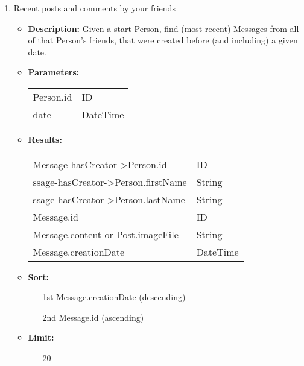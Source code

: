 {\begin{enumerate}
                \item Recent posts and comments by your friends
                    \begin{itemize}
                        \item \textbf{Description:}
                          Given a start Person, find (most recent) Messages from
                            all of that Person's friends, that were created before (and
                            including) a given date.    			
                        \item \textbf{Parameters:} \\
                            \begin{tabular}{ll}
                                Person.id 										& ID \\
                                date 											& DateTime \\
                            \end{tabular}
                        \item \textbf{Results:} \\
                            \begin{tabular}{ll}
                              Message-hasCreator->Person.id 										& ID \\
                                ssage-hasCreator->Person.firstName								& String \\
                                ssage-hasCreator->Person.lastName									& String \\
                                Message.id 								& ID \\
                                Message.content or Post.imageFile 	& String \\
                                Message.creationDate	& DateTime \\
                            \end{tabular}		
                        \item \textbf{Sort:}
                          \begin{itemize}
                            \item[1st] Message.creationDate (descending)
                            \item[2nd] Message.id (ascending)
                          \end{itemize}
                \item \textbf{Limit:}
                  \begin{itemize}
                    \item[] 20 
                  \end{itemize}
                    \end{itemize}


\end{enumerate}}
